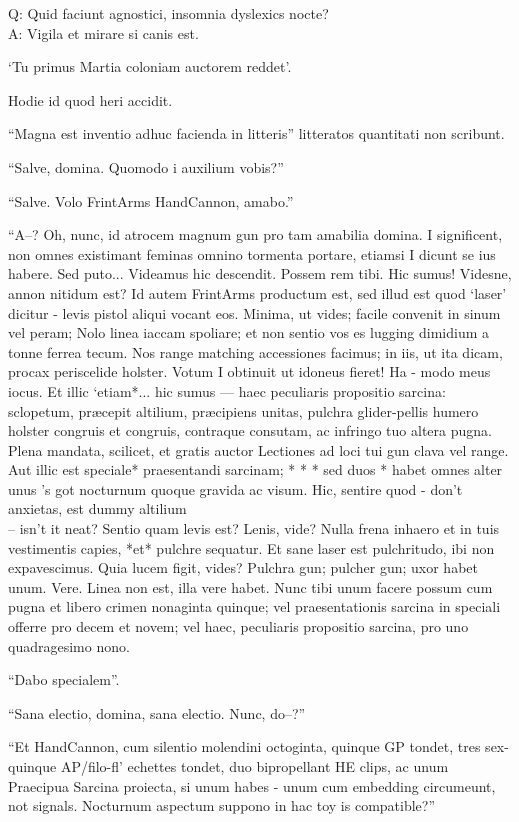 \documentclass[titlepage,12pt]{memoir}
\begin{document}
Q: Quid faciunt agnostici, insomnia dyslexics nocte?\\
A: Vigila et mirare si canis est.

‘Tu primus Martia coloniam auctorem reddet’.

Hodie id quod heri accidit.

“Magna est inventio adhuc facienda in litteris”
litteratos quantitati non scribunt.

“Salve, domina. Quomodo i auxilium vobis?”

“Salve. Volo FrintArms HandCannon, amabo.”

“A--? Oh, nunc, id atrocem magnum gun pro tam amabilia domina. I
significent, non omnes existimant feminas omnino tormenta portare, etiamsi I
dicunt se ius habere. Sed puto... Videamus
hic descendit. Possem rem tibi. Hic sumus!
Videsne, annon nitidum est? Id autem FrintArms productum est,
sed illud est quod ‘laser’ dicitur - levis pistol aliqui vocant
eos. Minima, ut vides; facile convenit in sinum vel peram; Nolo
linea iaccam spoliare; et non sentio vos es lugging dimidium a
tonne ferrea tecum. Nos range matching accessiones facimus;
in iis, ut ita dicam, procax periscelide holster. Votum I
obtinuit ut idoneus fieret! Ha - modo meus iocus. Et
illic ‘etiam*... hic sumus — haec peculiaris propositio sarcina: sclopetum,
præcepit altilium, præcipiens unitas, pulchra glider-pellis humero holster
congruis et congruis, contraque consutam, ac infringo tuo
altera pugna. Plena mandata, scilicet, et gratis auctor
Lectiones ad loci tui gun clava vel range. Aut illic est speciale*
praesentandi sarcinam; * * * sed duos * habet omnes alter unus ’s got
nocturnum quoque gravida ac visum. Hic, sentire quod - don’t
anxietas, est dummy altilium \\-- isn’t it neat? Sentio quam levis est?
Lenis, vide? Nulla frena inhaero et in tuis vestimentis capies, *et*
pulchre sequatur. Et sane laser est pulchritudo, ibi
non expavescimus. Quia lucem figit, vides? Pulchra gun;
pulcher gun; uxor habet unum. Vere. Linea non est, illa
vere habet. Nunc tibi unum facere possum cum pugna et libero
crimen nonaginta quinque; vel praesentationis sarcina in speciali
offerre pro decem et novem; vel haec, peculiaris propositio sarcina, pro
uno quadragesimo nono.

“Dabo specialem”.

“Sana electio, domina, sana electio. Nunc, do--?”

“Et HandCannon, cum silentio molendini octoginta, quinque GP tondet, tres
sex-quinque AP/filo-fl’ echettes tondet, duo bipropellant HE clips, ac unum
Praecipua Sarcina proiecta, si unum habes - unum cum embedding
circumeunt, not signals. Nocturnum aspectum suppono in hac toy is
compatible?”
\end{document}
